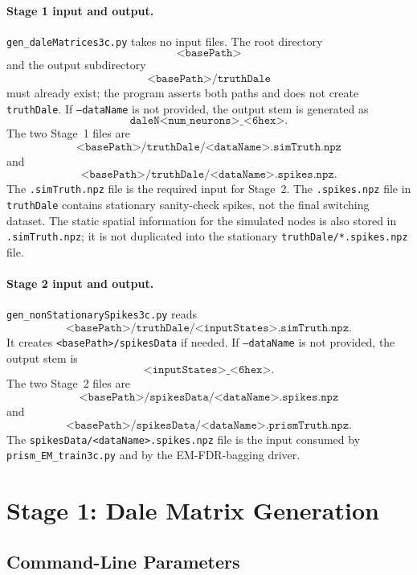 \documentclass[11pt]{article}
\begin{document}
\paragraph{Stage 1 input and output.}
\texttt{gen\_daleMatrices3c.py} takes no input files. The root directory
\[
\texttt{<basePath>}
\]
and the output subdirectory
\[
\texttt{<basePath>/truthDale}
\]
must already exist; the program asserts both paths and does not create
\texttt{truthDale}. If \texttt{--dataName} is not
provided, the output stem is generated as
\[
\texttt{daleN<num\_neurons>\_<6hex>}.
\]
The two Stage~1 files are
\[
\texttt{<basePath>/truthDale/<dataName>.simTruth.npz}
\]
and
\[
\texttt{<basePath>/truthDale/<dataName>.spikes.npz}.
\]
The \texttt{.simTruth.npz} file is the required input for Stage~2. The
\texttt{.spikes.npz} file in \texttt{truthDale} contains stationary
sanity-check spikes, not the final switching dataset.
The static spatial information for the simulated nodes is also stored in
\texttt{.simTruth.npz}; it is not duplicated into the stationary
\texttt{truthDale/*.spikes.npz} file.

\paragraph{Stage 2 input and output.}
\texttt{gen\_nonStationarySpikes3c.py} reads
\[
\texttt{<basePath>/truthDale/<inputStates>.simTruth.npz}.
\]
It creates \texttt{<basePath>/spikesData} if needed. If
\texttt{--dataName} is not provided, the output stem is
\[
\texttt{<inputStates>\_<6hex>}.
\]
The two Stage~2 files are
\[
\texttt{<basePath>/spikesData/<dataName>.spikes.npz}
\]
and
\[
\texttt{<basePath>/spikesData/<dataName>.prismTruth.npz}.
\]
The \texttt{spikesData/<dataName>.spikes.npz} file is the input consumed by
\texttt{prism\_EM\_train3c.py} and by the EM-FDR-bagging driver.

\section{Stage 1: Dale Matrix Generation}
\label{sec:dale_matrices}

\subsection{Command-Line Parameters}
\end{document}

